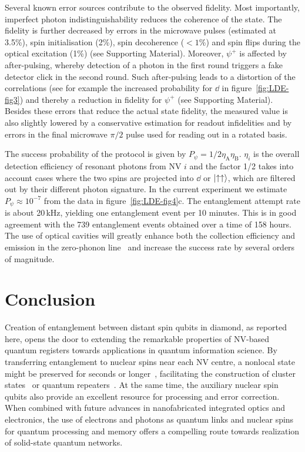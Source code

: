 Several known error sources contribute to the observed fidelity. Most importantly, imperfect photon indistinguishability reduces the coherence of the state. The fidelity is further decreased by errors in the microwave pulses (estimated at 3.5\%), spin initialisation (2\%), spin decoherence ($<1$\%) and spin flips during the optical excitation (1\%) (see Supporting Material). Moreover, $\psi^+$ is affected by after-pulsing, whereby detection of a photon in the first round triggers a fake detector click in the second round. Such after-pulsing leads to a distortion of the correlations (see for example the increased probability for $\dd$ in figure~\ref{fig:LDE-fig3}) and thereby a reduction in fidelity for $\psi^+$ (see Supporting Material). Besides these errors that reduce the actual state fidelity, the measured value is also slightly lowered by a conservative estimation for readout infidelities and by errors in the final microwave $\pi/2$ pulse used for reading out in a rotated basis.

The success probability of the protocol is given by $P_\psi =1/2 \eta_\text{A}\eta_\text{B}$. $\eta_i$ is the overall detection efficiency of resonant photons from NV $i$ and the factor 1/2 takes into account cases where the two spins are projected into $\dd$ or $\left|\uparrow\uparrow\right\rangle$, which are filtered out by their different photon signature. In the current experiment we estimate $P_\psi \approx10^{-7}$ from the data in figure~\ref{fig:LDE-fig4}c. The entanglement attempt rate is about 20$\,$kHz, yielding one entanglement event per 10 minutes. This is in good agreement with the 739 entanglement events obtained over a time of 158 hours. The use of optical cavities will greatly enhance both the collection efficiency and emission in the zero-phonon line~\cite{Aharonovich2011} and increase the success rate by several orders of magnitude.

\section{Conclusion}

Creation of entanglement between distant spin qubits in diamond, as reported here, opens the door to extending the remarkable properties of NV-based quantum registers towards applications in quantum information science. By transferring entanglement to nuclear spins near each NV centre, a nonlocal state might be preserved for seconds or longer~\cite{Maurer2012}, facilitating the construction of cluster states~\cite{Raussendorf2001} or quantum repeaters~\cite{Childress2006a}. At the same time, the auxiliary nuclear spin qubits also provide an excellent resource for processing and error correction. When combined with future advances in nanofabricated integrated optics and electronics, the use of electrons and photons as quantum links and nuclear spins for quantum processing and memory offers a compelling route towards realization of solid-state quantum networks.



